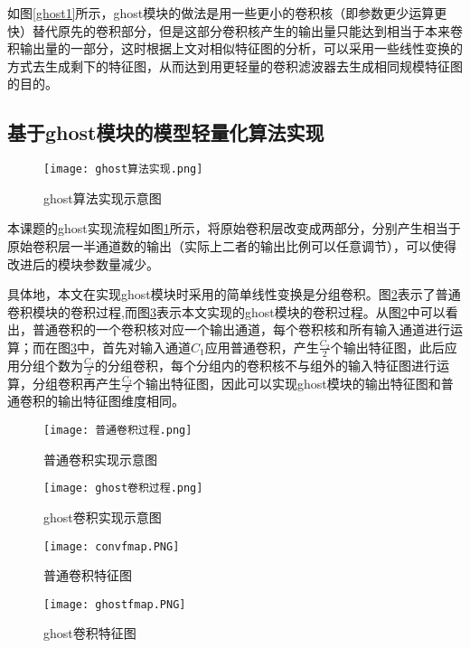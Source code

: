 如图\ref{ghost1}所示，ghost模块的做法是用一些更小的卷积核（即参数更少运算更快）替代原先的卷积部分，但是这部分卷积核产生的输出量只能达到相当于本来卷积输出量的一部分，这时根据上文对相似特征图的分析，可以采用一些线性变换的方式去生成剩下的特征图，从而达到用更轻量的卷积滤波器去生成相同规模特征图的目的。

\subsection{基于ghost模块的模型轻量化算法实现}

\begin{figure}[htbp]
    \centering
    \texttt{[image: ghost算法实现.png]}
    \caption{ghost算法实现示意图}
    \label{ghost2}
\end{figure}

本课题的ghost实现流程如图\ref{ghost2}所示，将原始卷积层改变成两部分，分别产生相当于原始卷积层一半通道数的输出（实际上二者的输出比例可以任意调节），可以使得改进后的模块参数量减少。

具体地，本文在实现ghost模块时采用的简单线性变换是分组卷积。图\ref{convp}表示了普通卷积模块的卷积过程,而图\ref{ghostp}表示本文实现的ghost模块的卷积过程。从图\ref{convp}中可以看出，普通卷积的一个卷积核对应一个输出通道，每个卷积核和所有输入通道进行运算；而在图\ref{ghostp}中，首先对输入通道$C_1$应用普通卷积，产生$\frac{C_2}{2}$个输出特征图，此后应用分组个数为$\frac{C_2}{2}$的分组卷积，每个分组内的卷积核不与组外的输入特征图进行运算，分组卷积再产生$\frac{C_2}{2}$个输出特征图，因此可以实现ghost模块的输出特征图和普通卷积的输出特征图维度相同。
\begin{figure}[htbp]
    \centering
    \texttt{[image: 普通卷积过程.png]}
    \caption{普通卷积实现示意图}
    \label{convp}
\end{figure}

\begin{figure}[htbp]
    \centering
    \texttt{[image: ghost卷积过程.png]}
    \caption{ghost卷积实现示意图}
    \label{ghostp}
\end{figure}

\begin{figure}[htbp]
	\centering
	\begin{minipage}{0.49\linewidth}
		\centering
		\texttt{[image: convfmap.PNG]}
		\caption{普通卷积特征图}
		\label{convf}%
	\end{minipage}
	\begin{minipage}{0.49\linewidth}
		\centering
		\texttt{[image: ghostfmap.PNG]}
		\caption{ghost卷积特征图}
		\label{ghostf}%
	\end{minipage}
\end{figure}

